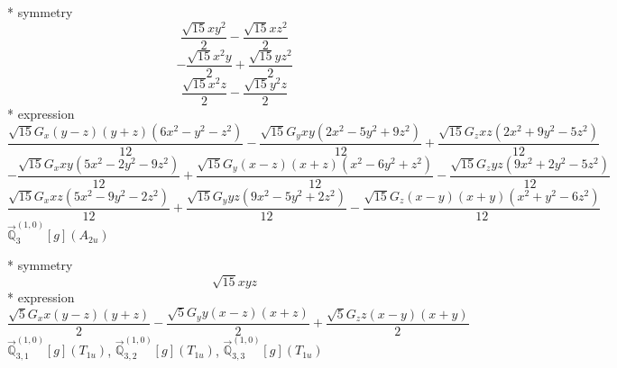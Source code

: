 \documentclass[fleqn,8pt]{jsarticle}
\begin{document}
\noindent\quad ** symmetry
\begin{dmath*}
\frac{\sqrt{15} x y^{2}}{2} - \frac{\sqrt{15} x z^{2}}{2}
\end{dmath*}
\begin{dmath*}
- \frac{\sqrt{15} x^{2} y}{2} + \frac{\sqrt{15} y z^{2}}{2}
\end{dmath*}
\begin{dmath*}
\frac{\sqrt{15} x^{2} z}{2} - \frac{\sqrt{15} y^{2} z}{2}
\end{dmath*}
\noindent\quad ** expression
\begin{dmath*}
\frac{\sqrt{15} G_{x} \left(y - z\right) \left(y + z\right) \left(6 x^{2} - y^{2} - z^{2}\right)}{12} - \frac{\sqrt{15} G_{y} x y \left(2 x^{2} - 5 y^{2} + 9 z^{2}\right)}{12} + \frac{\sqrt{15} G_{z} x z \left(2 x^{2} + 9 y^{2} - 5 z^{2}\right)}{12}
\end{dmath*}
\begin{dmath*}
- \frac{\sqrt{15} G_{x} x y \left(5 x^{2} - 2 y^{2} - 9 z^{2}\right)}{12} + \frac{\sqrt{15} G_{y} \left(x - z\right) \left(x + z\right) \left(x^{2} - 6 y^{2} + z^{2}\right)}{12} - \frac{\sqrt{15} G_{z} y z \left(9 x^{2} + 2 y^{2} - 5 z^{2}\right)}{12}
\end{dmath*}
\begin{dmath*}
\frac{\sqrt{15} G_{x} x z \left(5 x^{2} - 9 y^{2} - 2 z^{2}\right)}{12} + \frac{\sqrt{15} G_{y} y z \left(9 x^{2} - 5 y^{2} + 2 z^{2}\right)}{12} - \frac{\sqrt{15} G_{z} \left(x - y\right) \left(x + y\right) \left(x^{2} + y^{2} - 6 z^{2}\right)}{12}
\end{dmath*}
\noindent\quad $\vec{\mathbb{Q}}_{3}^{(1,0)}[g](A_{2u})$

\noindent\quad ** symmetry
\begin{dmath*}
\sqrt{15} x y z
\end{dmath*}
\noindent\quad ** expression
\begin{dmath*}
\frac{\sqrt{5} G_{x} x \left(y - z\right) \left(y + z\right)}{2} - \frac{\sqrt{5} G_{y} y \left(x - z\right) \left(x + z\right)}{2} + \frac{\sqrt{5} G_{z} z \left(x - y\right) \left(x + y\right)}{2}
\end{dmath*}
\noindent\quad $\vec{\mathbb{Q}}_{3,1}^{(1,0)}[g](T_{1u})$, $\vec{\mathbb{Q}}_{3,2}^{(1,0)}[g](T_{1u})$, $\vec{\mathbb{Q}}_{3,3}^{(1,0)}[g](T_{1u})$
\end{document}
